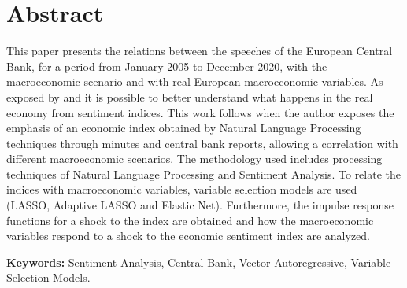 
\chapter*{Abstract}
This paper presents the relations between the speeches of the European Central Bank, for a period from January 2005 to December 2020, with the macroeconomic scenario and with real European macroeconomic variables. As exposed by \cite[]{shapiro2020measuring, shapiro2021taking} and \cite[]{barsky2012information} it is possible to better understand what happens in the real economy from sentiment indices. This work follows \cite{shapiro2020measuring} when the author exposes the emphasis of an economic index obtained by Natural Language Processing techniques through minutes and central bank reports, allowing a correlation with different macroeconomic scenarios. The methodology used includes processing techniques of Natural Language Processing and Sentiment Analysis. To relate the indices with macroeconomic variables, variable selection models are used (LASSO, Adaptive LASSO and Elastic Net). Furthermore, the impulse response functions for a shock to the index are obtained and how the macroeconomic variables respond to a shock to the economic sentiment index are analyzed.
\par
\vspace{0.5in}    
    
\noindent
{\bf Keywords:} Sentiment Analysis, Central Bank, Vector Autoregressive, Variable Selection Models.



  